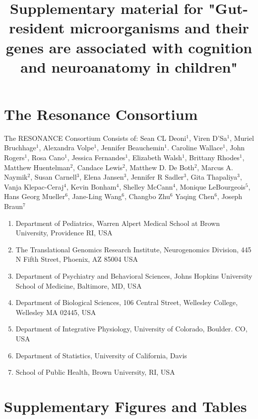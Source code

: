 \documentclass{article}
\title{Supplementary material for "Gut-resident microorganisms and their genes are associated with cognition and neuroanatomy in children"}
\begin{document}
\baselineskip24pt

\maketitle

\section*{The Resonance Consortium}

The RESONANCE Consortium Consists of:
Sean CL Deoni$^{1}$, Viren D'Sa$^{1}$, Muriel Bruchhage$^{1}$, Alexandra Volpe$^{1}$, Jennifer Beauchemin$^{1}$. Caroline Wallace$^{1}$, John Rogers$^{1}$, Rosa Cano$^{1}$, Jessica Fernandes$^{1}$, Elizabeth Walsh$^{1}$, Brittany Rhodes$^{1}$,
Matthew Huentelman$^{2}$, Candace Lewis$^{2}$, Matthew D. De Both$^{2}$, Marcus A. Naymik$^{2}$,
Susan Carnell$^{3}$, Elena Jansen$^{3}$, Jennifer R Sadler$^{3}$, Gita Thapaliya$^{3}$,
Vanja Klepac-Ceraj$^{4}$, Kevin Bonham$^{4}$, Shelley McCann$^{4}$,
Monique LeBourgeois$^{5}$,
Hans Georg Mueller$^{6}$, Jane-Ling Wang$^{6}$, Changbo Zhu$^{6}$ Yaqing Chen$^{6}$,
Joseph Braun$^{7}$

\begin{enumerate}[noitemsep]
  \item Department of Pediatrics, Warren Alpert Medical School at Brown University, Providence RI, USA
  \item The Translational Genomics Research Institute, Neurogenomics Division, 445 N Fifth Street, Phoenix, AZ 85004 USA
  \item Department of Psychiatry and Behavioral Sciences, Johns Hopkins University School of Medicine, Baltimore, MD, USA
  \item Department of Biological Sciences, 106 Central Street, Wellesley College, Wellesley MA 02445, USA
  \item Department of Integrative Physiology, University of Colorado, Boulder. CO, USA
  \item Department of Statistics, University of California, Davis
  \item School of Public Health, Brown University, RI, USA
\end{enumerate}

\section*{Supplementary Figures and Tables}
\end{document}
